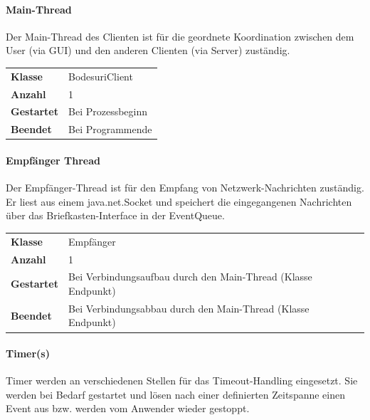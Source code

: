 \documentclass[12pt,halfparskip]{scrartcl}
\begin{document}

\paragraph{Main-Thread} %
\label{ssub:main_thread}

Der Main-Thread des Clienten ist für die geordnete Koordination zwischen dem User (via GUI) und den anderen Clienten (via Server) zuständig.


\begin{tabular}{@{} l p{12.5cm}}
\textbf{Klasse}       & BodesuriClient \\
\textbf{Anzahl}       & 1 \\
\textbf{Gestartet}    & Bei Prozessbeginn \\
\textbf{Beendet}      & Bei Programmende
\end{tabular}


\paragraph{Empfänger Thread} %
\label{ssub:empfänger_thread}

Der Empfänger-Thread ist für den Empfang von Netzwerk-Nachrichten zuständig. Er liest aus einem java.net.Socket und speichert die eingegangenen Nachrichten über das Briefkasten-Interface in der EventQueue.

\begin{tabular}{@{} l p{12.5cm}}
\textbf{Klasse}       & Empfänger \\
\textbf{Anzahl}       & 1 \\
\textbf{Gestartet}    & Bei Verbindungsaufbau durch den Main-Thread (Klasse Endpunkt) \\
\textbf{Beendet}      & Bei Verbindungsabbau durch den Main-Thread (Klasse Endpunkt)
\end{tabular}


\paragraph{Timer(s)} %
\label{ssub:timer_s_}

Timer werden an verschiedenen Stellen für das Timeout-Handling eingesetzt. Sie werden bei Bedarf gestartet und lösen nach einer definierten Zeitspanne einen Event aus bzw. werden vom Anwender wieder gestoppt.
\end{document}
